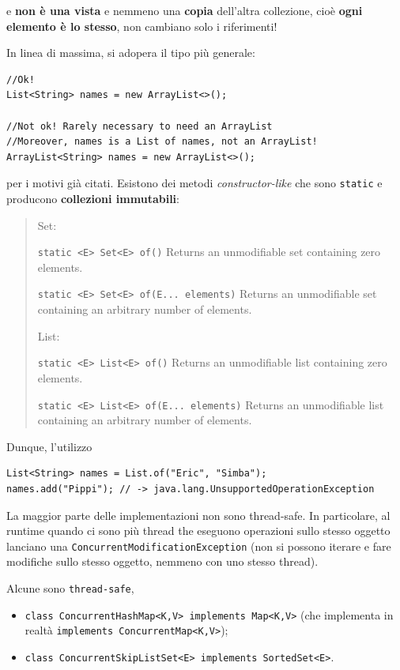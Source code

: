 \documentclass[\fontsizeclass,twocolumn]{\classname}
\theoremstyle{definition}
\theoremstyle{definition}
\begin{document}
e \textbf{non è una vista} e nemmeno una \textbf{copia} dell'altra collezione,
cioè \textbf{ogni elemento è lo stesso}, non cambiano solo i riferimenti!

In linea di massima, si adopera il tipo più generale:

\begin{lstlisting}
//Ok!
List<String> names = new ArrayList<>();

//Not ok! Rarely necessary to need an ArrayList
//Moreover, names is a List of names, not an ArrayList!
ArrayList<String> names = new ArrayList<>();
\end{lstlisting}

per i motivi già citati. Esistono dei metodi \emph{constructor\--like} che sono
\texttt{static} e producono \textbf{collezioni immutabili}:
\begin{quote}
    \footnotesize{Set:

\texttt{static <E> Set<E> 	of()} 	Returns an unmodifiable set containing zero elements.

\texttt{static <E> Set<E> 	of(E... elements)} 	Returns an unmodifiable set containing an arbitrary number of elements.

List:

\texttt{static <E> List<E> 	of()} 	Returns an unmodifiable list containing zero elements.

\texttt{static <E> List<E> 	of(E... elements)} 	Returns an unmodifiable list containing an arbitrary number of elements.}
\end{quote}

Dunque, l'utilizzo

\begin{lstlisting}
List<String> names = List.of("Eric", "Simba");
names.add("Pippi"); // -> java.lang.UnsupportedOperationException
\end{lstlisting}

La maggior parte delle implementazioni non sono thread\--safe. In particolare,
al runtime quando ci sono più thread the eseguono operazioni sullo stesso
oggetto lanciano una \texttt{ConcurrentModificationException} (non si possono
iterare e fare modifiche sullo stesso oggetto, nemmeno con uno stesso thread).

Alcune sono \texttt{thread\--safe},
\begin{itemize}
    \item \texttt{class ConcurrentHashMap<K,V> implements Map<K,V>} (che
        implementa in realtà \texttt{implements ConcurrentMap<K,V>});
    \item \texttt{class ConcurrentSkipListSet<E> implements SortedSet<E>}.
\end{itemize}
\end{document}
